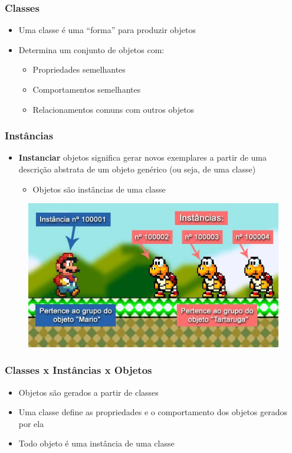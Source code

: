 \documentclass[aspectratio=169]{beamer}
\begin{document}
\begin{frame}\frametitle{Classes}
\begin{itemize}
	\item Uma classe é uma ``forma'' para produzir objetos
	\item Determina um conjunto de objetos com:
	\begin{itemize}
		\item Propriedades semelhantes
		\item Comportamentos semelhantes
		\item Relacionamentos comuns com outros objetos
	\end{itemize}
\end{itemize}
\end{frame}

\begin{frame}\frametitle{Instâncias}
\begin{itemize}
	\item \textbf{Instanciar} objetos significa gerar novos exemplares a partir de uma descrição abstrata de um objeto genérico (ou seja, de uma classe)
	\begin{itemize}
		\item Objetos são instâncias de uma classe
	\end{itemize}
\end{itemize}
\begin{figure}[h]
	\centering
	\includegraphics[height=0.5\paperheight]{imagens/instancias.jpg}
\end{figure}
\end{frame}

\begin{frame}\frametitle{Classes x Instâncias x Objetos}
\begin{itemize}
	\item Objetos são gerados a partir de classes
	\item Uma classe define as propriedades e o comportamento dos objetos gerados por ela
	\item Todo objeto é uma instância de uma classe
\end{itemize}
\end{frame}
\end{document}
